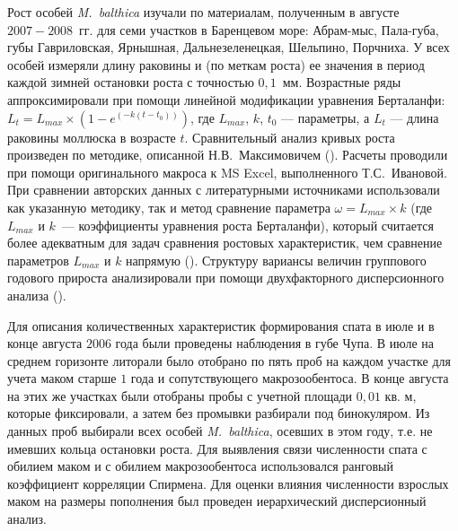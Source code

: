 Рост особей \textit{M.~balthica} изучали по материалам, полученным в августе $2007 - 2008$~гг. для семи участков в Баренцевом море: Абрам-мыс, Пала-губа, губы Гавриловская, Ярнышная, Дальнезеленецкая, Шельпино, Порчниха.
У всех особей измеряли длину раковины и (по меткам роста) ее значения в период каждой зимней остановки роста с точностью $0,1$~мм.
Возрастные ряды аппроксимировали при помощи линейной модификации уравнения Берталанфи: $L_{t} = L_{max} \times (1 - e^{(-k(t - t_{0}))})$, где $L_{max}$, $k$, $t_{0}$ --- параметры, а $L_{t}$ --- длина раковины моллюска в возрасте $t$.
Сравнительный анализ кривых роста произведен по методике, описанной Н.В.~Максимовичем (\cite*{Maximovich_1989}). 
Расчеты проводили при помощи оригинального макроса к MS Excel, выполненного Т.С.~Ивановой.
При сравнении авторских данных с литературными источниками использовали как указанную методику, так и метод сравнение параметра $\omega = L_{max} \times k$ (где $L_{max}$ и $k$~--- коэффициенты уравнения роста Берталанфи), который считается более адекватным для задач сравнения ростовых характеристик, чем сравнение параметров $L_{max}$ и $k$ напрямую (\cite{Appeldoorn_1983, Beukema_Meehan_1985}). 
Структуру вариансы величин группового годового прироста анализировали при помощи двухфакторного дисперсионного анализа (\cite{Chambers_Hastie_1991}). 

Для описания количественных характеристик формирования спата в июле и в конце августа $2006$ года были проведены наблюдения в губе Чупа.
В июле на среднем горизонте литорали было отобрано по пять проб на каждом участке для учета маком старше $1$ года и сопутствующего макрозообентоса. 
В конце августа на этих же участках были отобраны пробы с учетной площади $0,01$ кв. м, которые фиксировали, а затем без промывки разбирали под бинокуляром.  
Из данных проб выбирали всех особей \textit{M.~balthica}, осевших в этом году, т.е. не имевших кольца остановки роста. 
Для выявления связи численности спата с обилием маком и с обилием макрозообентоса использовался ранговый коэффициент корреляции Спирмена.
Для оценки влияния численности взрослых маком на размеры пополнения был проведен иерархический дисперсионный анализ.

